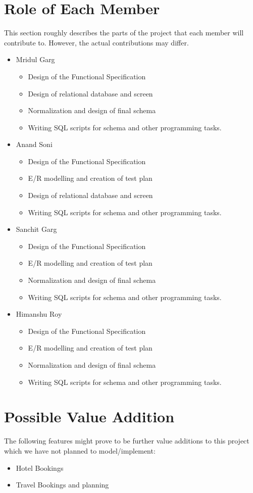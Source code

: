 \documentclass[11pt]{article}
\begin{document}
\section{Role of Each Member}
This section roughly describes the parts of the project that each member will contribute to. However, the actual contributions may differ.
\begin{itemize}
\item Mridul Garg
\begin{itemize}
\item Design of the Functional Specification
\item Design of relational database and screen
\item Normalization and design of final schema
\item Writing SQL scripts for schema and other programming tasks.
\end{itemize}
\item Anand Soni
\begin{itemize}
\item Design of the Functional Specification
\item E/R modelling and creation of test plan 
\item Design of relational database and screen
\item Writing SQL scripts for schema and other programming tasks.
\end{itemize}
\item Sanchit Garg
\begin{itemize}
\item Design of the Functional Specification
\item E/R modelling and creation of test plan
\item Normalization and design of final schema
\item Writing SQL scripts for schema and other programming tasks.
\end{itemize}
\item Himanshu Roy
\begin{itemize}
\item Design of the Functional Specification
\item E/R modelling and creation of test plan
\item Normalization and design of final schema
\item Writing SQL scripts for schema and other programming tasks.
\end{itemize}
\end{itemize}

\section{Possible Value Addition}
The following features might prove to be further value additions to this project which we have not planned to model/implement:
\begin{itemize}
\item Hotel Bookings
\item Travel Bookings and planning
\end{itemize}
\end{document}
